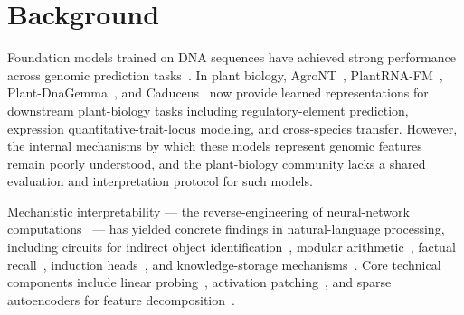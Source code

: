 \documentclass[11pt, a4paper]{article}
\begin{document}
\begin{abstract}
\vspace{0.4em}
\noindent\textbf{Conclusions.}
The protocol presented here --- annotated benchmarks, learned baselines,
GC-matched composition controls, phylogenetic residualization, sparse
autoencoders linked to documented plant TF motifs, and causal
per-component interventions --- is directly reusable for evaluating and
interpreting any plant genomic foundation model. Applied to Plant-DnaGemma
it reveals that the model encodes non-compositional phylogenetic structure
and biology-grounded features, while also honestly delimiting the regime in
which pretraining adds value over task-supervised baselines.
\end{abstract}

\clearpage

\section*{Background}
\label{sec:background}

Foundation models trained on DNA sequences have achieved strong performance
across genomic prediction tasks~\citep{dalla2023nucleotide, nguyen2024hyenadna,
ji2021dnabert, zhou2023dnabert2}. In plant biology, AgroNT~\citep{mendoza2024agront},
PlantRNA-FM~\citep{yu2024plantrna}, Plant-DnaGemma~\citep{zhang2024plantdnagemma},
and Caduceus~\citep{schiff2024caduceus} now provide learned representations
for downstream plant-biology tasks including regulatory-element prediction,
expression quantitative-trait-locus modeling, and cross-species transfer.
However, the internal mechanisms by which these models represent genomic
features remain poorly understood, and the plant-biology community lacks a
shared evaluation and interpretation protocol for such models.

Mechanistic interpretability --- the reverse-engineering of neural-network
computations~\citep{elhage2022toy, olah2020zoom, conmy2023towards} --- has
yielded concrete findings in natural-language processing, including circuits
for indirect object identification~\citep{wang2023interpretability}, modular
arithmetic~\citep{neel2023grokking}, factual recall~\citep{meng2022locating},
induction heads~\citep{olsson2022context}, and knowledge-storage
mechanisms~\citep{geva2023dissecting}. Core technical components include
linear probing~\citep{alain2017understanding, belinkov2017neural,
hewitt2019structural}, activation patching~\citep{vig2020investigating,
meng2022locating}, and sparse autoencoders for feature
decomposition~\citep{cunningham2023sparse, bricken2023monosemanticity,
templeton2024scaling, gao2024scaling}.
\end{document}
